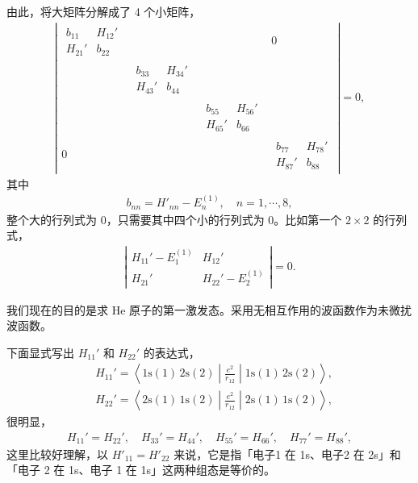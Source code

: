 由此，将大矩阵分解成了 4 个小矩阵，
\begin{align}
\left|
\begin{matrix}
\begin{matrix}
b_{11} & H_{12}' \\ H_{21}' & b_{22}
\end{matrix} & {} & {} & 0 \\
{} & \begin{matrix}
    b_{33} & H_{34}' \\ H_{43}' & b_44
\end{matrix} & {} & {} \\
{} & {} &
\begin{matrix}
    b_{55} & H_{56}' \\ H_{65}' & b_{66}
\end{matrix} & {} \\
0& {} & {} &\begin{matrix}
    b_{77} & H_{78}' \\ H_{87}' & b_{88}
\end{matrix}
\end{matrix}
\right|=0,
\end{align}
其中
\begin{align}
    b_{nn} = H'_{nn} - E_n^{(1)}, \quad n=1,\cdots,8,
\end{align}
整个大的行列式为 0，只需要其中四个小的行列式为 0。比如第一个 $2\times2$ 的行列式，
\begin{align}
    \label{eq:he_excited_2times2}
    \left|\begin{matrix}
        H_{11}'-E_1^{(1)} & H_{12}' \\
        H_{21}' & H_{22}' - E_2^{(1)}
    \end{matrix}
    \right|=0. 
\end{align}


我们现在的目的是求 He 原子的第一激发态。采用无相互作用的波函数作为未微扰波函数。

下面显式写出 $H_{11}'$ 和 $H_{22}'$ 的表达式，
\begin{align}
&H_{11}' = \left\langle \mathrm{1s(1)\,2s(2)} \middle| \frac{e^2}{r_{12}} \middle| \mathrm{1s(1)\,2s(2)} \right\rangle, \\
&H_{22}' = \left\langle \mathrm{2s(1)\,1s(2)} \middle| \frac{e^2}{r_{12}} \middle| \mathrm{2s(1)\,1s(2)} \right\rangle, 
\end{align}
很明显，
\begin{align}
    H_{11}' = H_{22}', \quad H_{33}' = H_{44}', \quad H_{55}' = H_{66}', \quad H_{77}' = H_{88}',
\end{align}
这里比较好理解，以 $H'_{11} = H'_{22}$ 来说，它是指「电子1 在 1s、电子2 在 2s」和「电子 2 在 1s、电子 1 在 1s」这两种组态是等价的。

